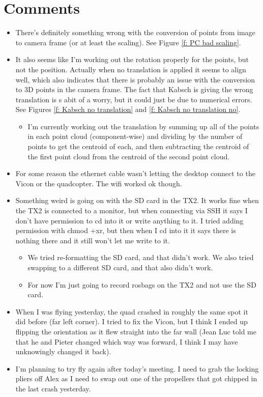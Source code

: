 \documentclass[12pt,a4paper]{article}
\begin{document}
\section{Comments}
\begin{itemize}
\item There's definitely something wrong with the conversion of points from image to camera frame (or at least the scaling). See Figure \ref{f: PC bad scaling}.
\item It also seems like I'm working out the rotation properly for the points, but not the position. Actually when no translation is applied it seems to align well, which also indicates that there is probably an issue with the conversion to 3D points in the camera frame. The fact that Kabsch is giving the wrong translation is s abit of a worry, but it could just be due to numerical errors. See Figures \ref{f: Kabsch no translation} and \ref{f: Kabsch no translation no}. 
\begin{itemize}
\item I'm currently working out the translation by summing up all of the points in each point cloud (component-wise) and dividing by the number of points to get the centroid of each, and then subtracting the centroid of the first point cloud from the centroid of the second point cloud. 
\end{itemize}
\item For some reason the ethernet cable wasn't letting the desktop connect to the Vicon or the quadcopter. The wifi worked ok though.
\item Something weird is going on with the SD card in the TX2. It works fine when the TX2 is connected to a monitor, but when connecting via SSH it says I don't have permission to cd into it or write anything to it. I tried adding permission with chmod +xr, but then when I cd into it it says there is nothing there and it still won't let me write to it.
\begin{itemize}
\item We tried re-formatting the SD card, and that didn't work. We also tried swapping to a different SD card, and that also didn't work.
\item For now I'm just going to record rosbags on the TX2 and not use the SD card.
\end{itemize}
\item When I was flying yesterday, the quad crashed in roughly the same spot it did before (far left corner). I tried to fix the Vicon, but I think I ended up flipping the orientation as it flew straight into the far wall (Jean Luc told me that he and Pieter changed which way was forward, I think I may have unknowingly changed it back).
\item I'm planning to try fly again after today's meeting. I need to grab the locking pliers off Alex as I need to swap out one of the propellers that got chipped in the last crash yesterday.
\end{itemize}
\end{document}
